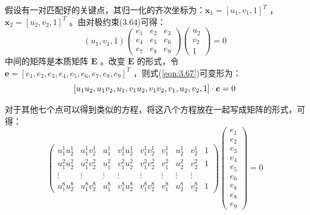 假设有一对匹配好的关键点，其归一化的齐次坐标为：$\boldsymbol{x}_{1}=\left[u_{1}, v_{1}, 1\right]^{T}$ ，$\boldsymbol{x}_{2}=\left[u_{2}, v_{2}, 1\right]^{T}  $ 。由对极约束(3.64)可得：
\begin{equation}
\label{eqn:3.67}
\left(u_{1}, v_{1}, 1\right) \left( \begin{array}{ccc}{e_{1}} & {e_{2}} & {e_{3}} \\ {e_{4}} & {e_{5}} & {e_{6}} \\ {e_{7}} & {e_{8}} & {e_{9}}\end{array}\right) \left( \begin{array}{l}{u_{2}} \\ {v_{2}} \\ {1}\end{array}\right)=0
\end{equation}
中间的矩阵是本质矩阵 $\bm{E} $ 。改变 $\bm{E} $ 的形式，令 $ \boldsymbol e=\left[e_{1}, e_{2}, e_{3}, e_{4}, e_{5}, e_{6}, e_{7}, e_{8}, e_{9}\right]^{T} $ ，则式(\ref{eqn:3.67})可变形为：
\begin{equation}
\label{eqn:3.68}
\setlength{\abovedisplayskip}{6pt}
\setlength{\belowdisplayskip}{6pt}
\left[u_{1} u_{2}, u_{1} v_{2}, u_{1}, v_{1} u_{2}, v_{1} v_{2}, v_{1}, u_{2}, v_{2}, 1\right] \cdot \boldsymbol e=0
\end{equation}

对于其他七个点可以得到类似的方程，将这八个方程放在一起写成矩阵的形式，可得：
\begin{equation}
\label{eqn:3.69}
\left( \begin{array}{ccccccccc}
{u_{1}^{1} u_{2}^{1}} & {u_{1}^{1} v_{2}^{1}} & {u_{1}^{1}} & {v_{1}^{1} u_{2}^{1}} & {v_{1}^{1} v_{2}^{1}} & {v_{1}^{1}} & {u_{2}^{1}} & {v_{2}^{1}} & {1}  \\ 
{u_{1}^{2} u_{2}^{2}} & {u_{1}^{2} v_{2}^{2}} & {u_{1}^{2}} & {v_{1}^{2} u_{2}^{2}} & {v_{1}^{2} v_{2}^{2}} & {v_{1}^{2}} & {u_{2}^{2}} & {v_{2}^{2}} & {1} \\ 
{\vdots} & {\vdots} & {\vdots} & {\vdots} & {\vdots} & {\vdots} & {\vdots} & {\vdots} \\ 
{u_{1}^{8} u_{2}^{8}} & {u_{1}^{8} v_{2}^{8}} & {u_{1}^{8}} & {v_{1}^{8} u_{2}^{8}} & {v_{1}^{8} v_{2}^{8}} & {v_{1}^{8}} & {u_{2}^{8}} & {v_{2}^{8}} & {1}
\end{array}\right)
\left( \begin{array}{c}{e_{1}} \\ {e_{2}} \\ {e_{3}} \\ {e_{4}} \\ {e_{5}} \\ {e_{6}} \\ {e_{8}} \\ {e_{8}} \\ {e_{9}}\end{array}\right)
=0
\end{equation}

